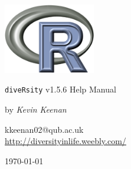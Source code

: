 \begin{titlepage}
\begin{center}
\includegraphics[width=40mm]{Rlogo_3.png}
\end{center}
\begin{center}
\LARGE
\texttt{diveRsity} v1.5.6 Help Manual
\end{center}
\begin{center}
\Large
by \emph{Kevin Keenan}
\end{center}
\begin{center}
\normalsize
kkeenan02@qub.ac.uk\\
\vspace{0.5cm}
\url{http://diversityinlife.weebly.com/}
\end{center}
\begin{center}
\small
\today
\end{center}
\end{titlepage}